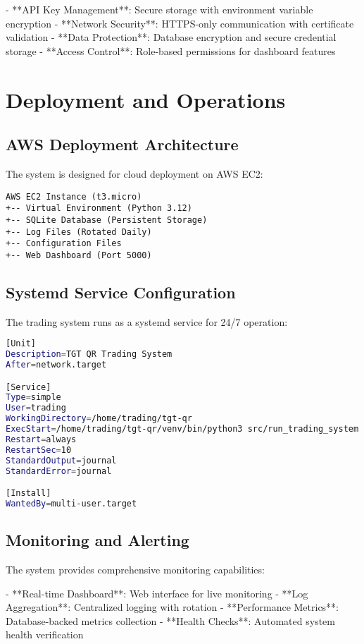 \documentclass[12pt,a4paper]{article}
\begin{document}
- **API Key Management**: Secure storage with environment variable encryption
- **Network Security**: HTTPS-only communication with certificate validation
- **Data Protection**: Database encryption and secure credential storage
- **Access Control**: Role-based permissions for dashboard features

\section{Deployment and Operations}

\subsection{AWS Deployment Architecture}

The system is designed for cloud deployment on AWS EC2:

\begin{verbatim}
AWS EC2 Instance (t3.micro)
+-- Virtual Environment (Python 3.12)
+-- SQLite Database (Persistent Storage)
+-- Log Files (Rotated Daily)
+-- Configuration Files
+-- Web Dashboard (Port 5000)
\end{verbatim}

\subsection{Systemd Service Configuration}

The trading system runs as a systemd service for 24/7 operation:

\begin{lstlisting}[language=bash, caption=Systemd Service Configuration]
[Unit]
Description=TGT QR Trading System
After=network.target

[Service]
Type=simple
User=trading
WorkingDirectory=/home/trading/tgt-qr
ExecStart=/home/trading/tgt-qr/venv/bin/python3 src/run_trading_system.py
Restart=always
RestartSec=10
StandardOutput=journal
StandardError=journal

[Install]
WantedBy=multi-user.target
\end{lstlisting}

\subsection{Monitoring and Alerting}

The system provides comprehensive monitoring capabilities:

- **Real-time Dashboard**: Web interface for live monitoring
- **Log Aggregation**: Centralized logging with rotation
- **Performance Metrics**: Database-backed metrics collection
- **Health Checks**: Automated system health verification
\end{document}
